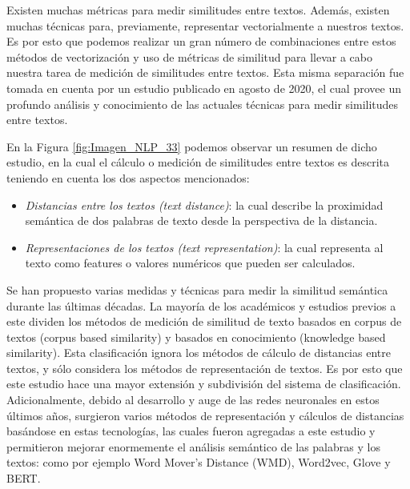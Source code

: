\documentclass[12pt,a4paper]{article}
\begin{document}
\begin{sloppypar}
Existen muchas métricas para medir similitudes entre textos. Además, existen muchas técnicas para, previamente, representar vectorialmente a nuestros textos. Es por esto que podemos realizar un gran número de combinaciones entre estos métodos de vectorización y uso de métricas de similitud para llevar a cabo nuestra tarea de medición de similitudes entre textos. Esta misma separación fue tomada en cuenta por un estudio publicado en agosto de 2020\cite{similarity_survey}, el cual provee un profundo análisis y conocimiento de las actuales técnicas para medir similitudes entre textos.

En la Figura \ref{fig:Imagen_NLP_33} podemos observar un resumen de dicho estudio, en la cual el cálculo o medición de similitudes entre textos es descrita teniendo en cuenta los dos aspectos mencionados: 
\begin{itemize}
\item \textit{Distancias entre los textos (text distance)}: la cual describe la proximidad semántica de dos palabras de texto desde la perspectiva de la distancia. 
\item \textit{Representaciones de los textos (text representation)}: la cual representa al texto como features o valores numéricos que pueden ser calculados. 
\end{itemize}

Se han propuesto varias medidas y técnicas para medir la similitud semántica durante las últimas décadas. La mayoría de los académicos y estudios previos a este dividen los métodos de medición de similitud de texto basados en corpus de textos (corpus based similarity) y basados en conocimiento (knowledge based similarity)\cite{NLP_16}. Esta clasificación ignora los métodos de cálculo de distancias entre textos, y sólo considera los métodos de representación de textos. 
Es por esto que este estudio\cite{similarity_survey} hace una mayor extensión y subdivisión del sistema de clasificación. Adicionalmente, debido al desarrollo y auge de las redes neuronales en estos últimos años, surgieron varios métodos de representación y cálculos de distancias basándose en estas tecnologías, las cuales fueron agregadas a este estudio y permitieron mejorar enormemente el análisis semántico de las palabras y los textos: como por ejemplo Word Mover’s Distance (WMD), Word2vec, Glove y BERT. 
\\\\


\end{sloppypar}
\end{document}
